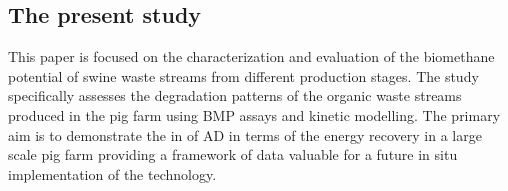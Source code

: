\subsection{The present study}
This paper is focused on the characterization and evaluation of the biomethane potential of swine waste streams from different production stages. The study specifically assesses the degradation patterns of the organic waste streams produced in the pig farm using BMP assays and kinetic modelling. The primary aim is to demonstrate the in of AD in terms of the energy recovery in a large scale pig farm providing a framework of data valuable for a future in situ implementation of the technology.